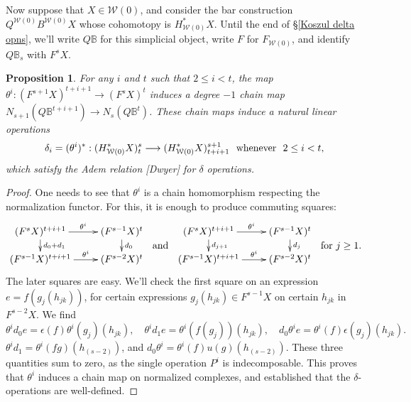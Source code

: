 \documentclass[11pt]{amsart}
\theoremstyle{plain}
\newtheorem{prop}[thm]{Proposition}
\theoremstyle{definition}
\renewcommand{\to}{\longrightarrow}
\newcommand{\calW}{\mathcal{W}}
\theoremstyle{plain}
\begin{document}
\begin{Cohomology operations for unstable Lie algebras over P}
Now suppose that $X\in\calW(0)$, and consider the bar construction $Q^{\calW(0)}B^{\calW(0)}X$ whose cohomotopy is $H^*_{\calW(0)}X$. Until the end of \S\ref{Koszul delta opns}, we'll write $Q\mathbb{B}$ for this simplicial object, write $F$ for $F_{\calW(0)}$, and identify $Q\mathbb{B}_s$ with $F^sX$.
\begin{prop}
For any $i$ and $t$ such that $2\leq i <t$, the map $\theta^i:(F^{s+1}X)^{t+i+1}\to (F^sX)^{t}$ induces a degree $-1$ chain map $N_{s+1}(Q\mathbb{B}^{t+i+1})\to N_{s}(Q\mathbb{B}^{t})$. These chain maps induce a natural linear operations
\[\delta_i=(\theta^i)^*:(H^*_{\calW(0)}X)^{s}_t\to (H^*_{\calW(0)}X)^{s+1}_{t+i+1}\textup{\ \ whenever\ \ }2\leq i <t,\] 
which satisfy the Adem relation [Dwyer] for $\delta$ operations.
\end{prop}
\begin{proof}
One needs to see that $\theta^i$ is a chain homomorphism respecting the normalization functor.
For this, it is enough to produce commuting squares:
\[\xymatrix@R=4mm{
(F^sX)^{t+i+1}\ar[r]^-{\theta^i}
\ar[d]^-{d_0+d_1}&%
(F^{s-1}X)^{t}
\ar[d]^-{d_0}
\\%
(F^{s-1}X)^{t+i+1}\ar[r]^-{\theta^i}&%
(F^{s-2}X)^{t}%
}
\raisebox{-5mm}{\ \ and\ \ }
\xymatrix@R=4mm{
(F^sX)^{t+i+1}\ar[r]^-{\theta^i}
\ar[d]^-{d_{j+1}}&%
(F^{s-1}X)^{t}
\ar[d]^-{d_j}
\\%
(F^{s-1}X)^{t+i+1}\ar[r]^-{\theta^i}&%
(F^{s-2}X)^{t}%
}\raisebox{-5mm}{\ \ for $j\geq 1$.}\]
The later squares are easy. We'll check the first square on an expression $e=f(g_j(h_{jk}))$, for certain expressions $g_j(h_{jk})\in F^{s-1}X$ on certain $h_{jk}$ in $F^{s-2}X$. We find
\[\theta^i d_0e=\epsilon(f)\theta^i (g_j)(h_{jk}),\quad \theta^i d_1e=\theta^i (f(g_j))(h_{jk}),\quad d_0\theta^i e=\theta^i (f)\epsilon(g_j)(h_{jk}).\]
$\theta^i d_1=\theta^i (fg)(h_{(s-2)})$, and
$d_0\theta^i =\theta^i (f)u(g)(h_{(s-2)})$. 
These three quantities sum to zero, as the single operation $P^i$ is indecomposable. This proves that $\theta^i$ induces a chain map on normalized complexes, and established that the $\delta$-operations are well-defined.


\end{proof}
\end{Cohomology operations for unstable Lie algebras over P}
\end{document}
